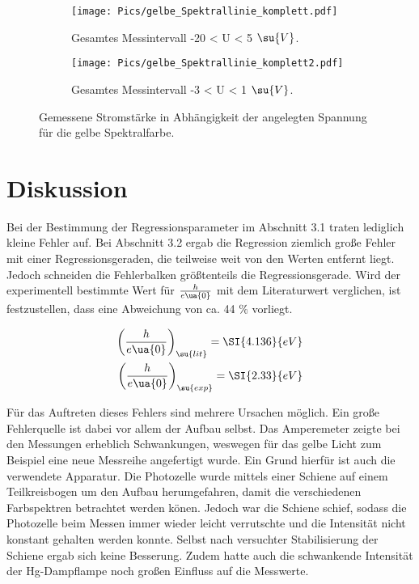 \begin{figure}
  \centering
  \begin{subfigure}{0.8\textwidth}
    \texttt{[image: Pics/gelbe\_Spektrallinie\_komplett.pdf]}\\[0cm]
    \caption{Gesamtes Messintervall -20 < U < 5 $\su{V}$.}
    \label{fig:Komplett1}
  \end{subfigure}
  \begin{subfigure}{0.8\textwidth}
    \texttt{[image: Pics/gelbe\_Spektrallinie\_komplett2.pdf]}\\[0cm]
    \caption{Gesamtes Messintervall -3 < U < 1 $\su{V}$.}
    \label{fig:Komplett2}
  \end{subfigure}
  \caption{Gemessene Stromstärke in Abhängigkeit der angelegten Spannung für die
           gelbe Spektralfarbe.}
  \label{fig:GelbKomplett}
\end{figure}

\section{Diskussion}

Bei der Bestimmung der Regressionsparameter im Abschnitt 3.1 traten lediglich
kleine Fehler auf. Bei Abschnitt 3.2 ergab die Regression ziemlich große
Fehler mit einer Regressionsgeraden, die teilweise weit von den Werten entfernt liegt.
Jedoch schneiden die Fehlerbalken größtenteils die Regressionsgerade.
Wird der experimentell bestimmte Wert für $\frac{h}{e\ua{0}}$ mit
dem Literaturwert\cite{Quelle2} verglichen, ist festzustellen, dass eine Abweichung von ca. 44 $\%$
vorliegt.

\begin{align}
  \left( \frac{h}{e\ua{0}} \right)_{\su{lit}}  =  \SI{4.136}{eV}\\
  \left( \frac{h}{e\ua{0}} \right)_{\su{exp}} =  \SI{2.33}{eV}
\end{align}

Für das Auftreten dieses Fehlers sind mehrere Ursachen möglich. Ein große Fehlerquelle
ist dabei vor allem der Aufbau selbst. Das Amperemeter zeigte bei den Messungen
erheblich Schwankungen, weswegen für das gelbe Licht zum Beispiel eine neue Messreihe
angefertigt wurde. Ein Grund hierfür ist auch die verwendete Apparatur. Die Photozelle
wurde mittels einer Schiene auf einem Teilkreisbogen um den Aufbau herumgefahren,
damit die verschiedenen Farbspektren betrachtet werden könen. Jedoch
war die Schiene schief, sodass die Photozelle beim Messen immer wieder leicht
verrutschte und die Intensität nicht konstant gehalten werden konnte. Selbst nach
versuchter Stabilisierung der Schiene ergab sich keine Besserung. Zudem hatte
auch die schwankende Intensität der Hg-Dampflampe noch großen Einfluss auf die
Messwerte.

